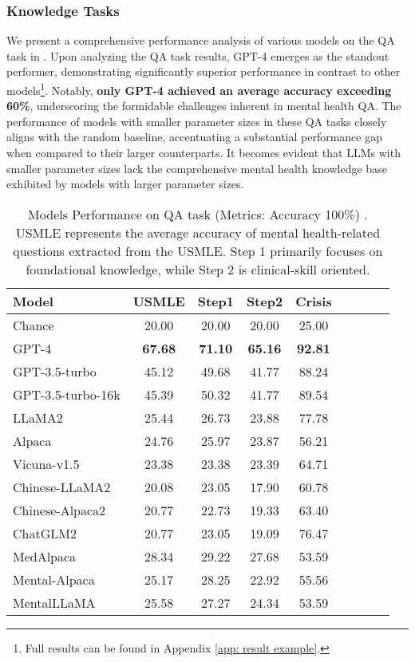 \subsubsection{Knowledge Tasks} We present a comprehensive performance analysis of various models on the QA task in . Upon analyzing the QA task results, GPT-4 emerges as the standout performer, demonstrating significantly superior performance in contrast to other models\footnote{Full results can be found in Appendix \ref{app: result example}.}. Notably, \textbf{only GPT-4 achieved an average accuracy exceeding 60\%}, underscoring the formidable challenges inherent in mental health QA. The performance of models with smaller parameter sizes in these QA tasks closely aligns with the random baseline, accentuating a substantial performance gap when compared to their larger counterparts. It becomes evident that LLMs with smaller parameter sizes lack the comprehensive mental health knowledge base exhibited by models with larger parameter sizes. 
\begin{table}[ht]
\centering
\footnotesize
\begin{tabular}{l c c c c c c c c}
\hline
\textbf{Model} & \textbf{USMLE} & \textbf{Step1} & \textbf{Step2} & \textbf{Crisis}\\
\hline
Chance & 20.00 & 20.00 & 20.00 & 25.00\\
\hline
GPT-4 & \textbf{67.68} & \textbf{71.10} & \textbf{65.16} & \textbf{92.81}\\
GPT-3.5-turbo & 45.12 & 49.68 & 41.77 & 88.24\\
GPT-3.5-turbo-16k & 45.39 & 50.32 & 41.77 & 89.54\\
\hline
LLaMA2 & 25.44 & 26.73 & 23.88 & 77.78\\
Alpaca & 24.76 & 25.97 & 23.87 & 56.21 \\
Vicuna-v1.5 & 23.38 & 23.38 & 23.39 & 64.71\\
\hline
Chinese-LLaMA2 & 20.08 & 23.05 & 17.90 & 60.78\\
Chinese-Alpaca2 & 20.77 & 22.73 & 19.33 & 63.40\\
ChatGLM2 & 20.77 & 23.05 & 19.09 & 76.47\\
\hline
MedAlpaca & 28.34 & 29.22 & 27.68 & 53.59 \\
Mental-Alpaca & 25.17 & 28.25 & 22.92 & 55.56 \\
MentalLLaMA & 25.58 & 27.27 & 24.34 & 53.59 \\
\hline
\end{tabular}
\caption{Models Performance on QA task (Metrics: Accuracy 100\%)%
. USMLE represents the average accuracy of mental health-related questions extracted from the USMLE. %
Step 1 primarily focuses on foundational knowledge, while Step 2 is clinical-skill oriented.}
\label{tab: mental health QA}
\end{table}

